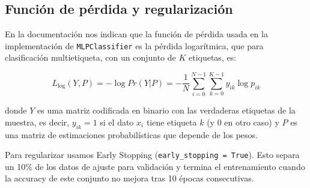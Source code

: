 \documentclass[a4]{article}
\begin{document}
\subsection{Función de pérdida y regularización}

En la documentación nos indican que la función de pérdida usada en la implementación de \texttt{MLPClassifier} es la pérdida logarítmica, que para clasificación multietiqueta, con un conjunto de $K$ etiquetas, es:

\[ L_{\log}(Y,P) = -\log Pr(Y|P) = -\frac{1}{N}\sum\limits_{i=0}^{N-1}\sum\limits_{k=0}^{K-1} y_{ik}\log p_{ik}\]

donde $Y$ es uma matriz codificada en binario con las verdaderas etiquetas de la muestra, es decir, $y_{ik} = 1$ si el dato $x_i$ tiene etiqueta $k$ (y $0$ en otro caso) y $P$ es una matriz de estimaciones probabilísticas que depende de los pesos.

Para regularizar usamos Early Stopping (\texttt{early\_stopping = True}). Esto separa un 10\% de los datos de ajuste para validación y termina el entrenamiento cuando la accuracy de este conjunto no mejora tras 10 épocas consecutivas.

\end{document}
